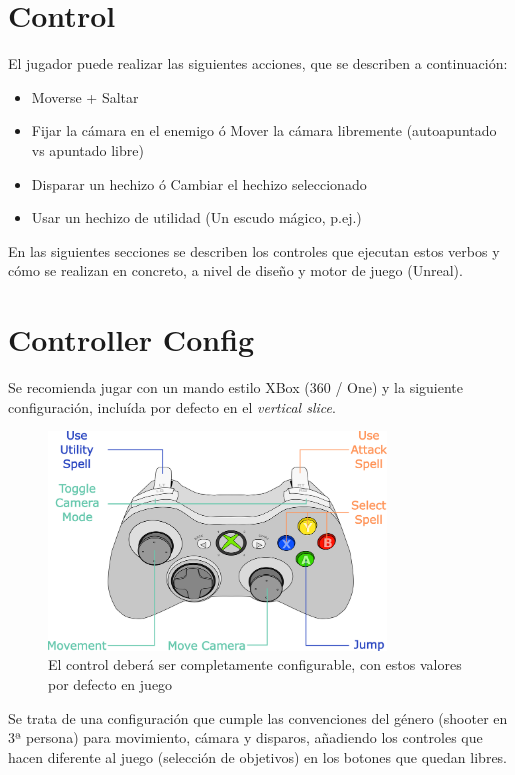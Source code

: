 \documentclass[12pt]{report}
\begin{document}
\section{Control}

El jugador puede realizar las siguientes acciones, que se describen a continuación:

\begin{itemize}
	\item Moverse + Saltar
	\item Fijar la cámara en el enemigo ó Mover la cámara libremente (autoapuntado vs apuntado libre)
	\item Disparar un hechizo ó Cambiar el hechizo seleccionado
	\item Usar un hechizo de utilidad (Un escudo mágico, p.ej.)
\end{itemize}

En las siguientes secciones se describen los controles que ejecutan estos verbos y cómo se realizan en concreto, a nivel de diseño y motor de juego (Unreal).

\section{Controller Config}
\label{control1}

Se recomienda jugar con un mando estilo XBox (360 / One) y la siguiente configuración, incluída por defecto en el \textit{vertical slice}.

\begin{figure}[h]
    \centering
    \includegraphics[width=0.8\textwidth]{controller}
    \caption{El control deberá ser completamente configurable, con estos valores por defecto en juego}
\end{figure}

Se trata de una configuración que cumple las convenciones del género (shooter en 3ª persona) para movimiento, cámara y disparos, añadiendo los controles que hacen diferente al juego (selección de objetivos) en los botones que quedan libres.
\end{document}
